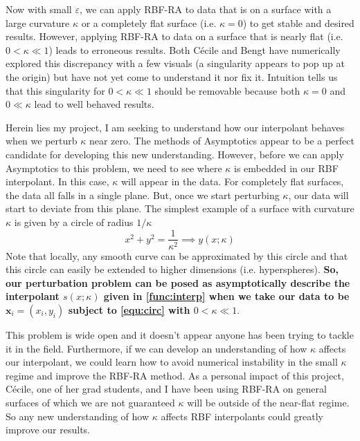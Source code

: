 \documentclass[a4paper,11pt]{article}
\newcommand{\eps}{\varepsilon}
\begin{document}
Now with small $ \eps $, we can apply RBF-RA to data that is on a surface with a large curvature $ \kappa $ or a completely flat surface (i.e. $ \kappa = 0 $) to get stable and desired results. However, applying RBF-RA to data on a surface that is nearly flat (i.e. $ 0 < \kappa \ll 1 $) leads to erroneous results. Both C\'ecile and Bengt have numerically explored this discrepancy with a few visuals (a singularity appears to pop up at the origin) but have not yet come to understand it nor fix it. Intuition tells us that this singularity for $ 0 < \kappa \ll 1 $ should be removable because both $ \kappa = 0 $ and $ 0 \ll \kappa $ lead to well behaved results. 

Herein lies my project, I am seeking to understand how our interpolant behaves when we perturb $ \kappa $ near zero.  The methods of Asymptotics appear to be a perfect candidate for developing this new understanding. However, before we can apply Asymptotics to this problem, we need to see where $ \kappa $ is embedded in our RBF interpolant. In this case, $ \kappa $ will appear in the data. For completely flat surfaces, the data all falls in a single plane. But, once we start perturbing $ \kappa $, our data will start to deviate from this plane. The simplest example of a surface with curvature $ \kappa $ is given by a circle of radius $ 1/\kappa $
\begin{equation}
	x^2 + y^2 = \frac{1}{\kappa^2} \implies y(x; \kappa) \label{equ:circ}
\end{equation}
Note that locally, any smooth curve can be approximated by this circle and that this circle can easily be extended to higher dimensions (i.e. hyperspheres). \textbf{So, our perturbation problem can be posed as asymptotically describe the interpolant $ s(x; \kappa) $ given in \eqref{func:interp} when we take our data to be $ \mathbf{x}_i = (x_i, y_i) $ subject to \eqref{equ:circ} with $ 0 < \kappa \ll 1 $}.

This problem is wide open and it doesn't appear anyone has been trying to tackle it in the field. Furthermore, if we can develop an understanding of how $ \kappa $ affects our interpolant, we could learn how to avoid numerical instability in the small $ \kappa $ regime and improve the RBF-RA method. As a personal impact of this project, C\'ecile, one of her grad students, and I have been using RBF-RA on general surfaces of which we are not guaranteed $ \kappa $ will be outside of the near-flat regime. So any new understanding of how $ \kappa $ affects RBF interpolants could greatly improve our results.
\end{document}
